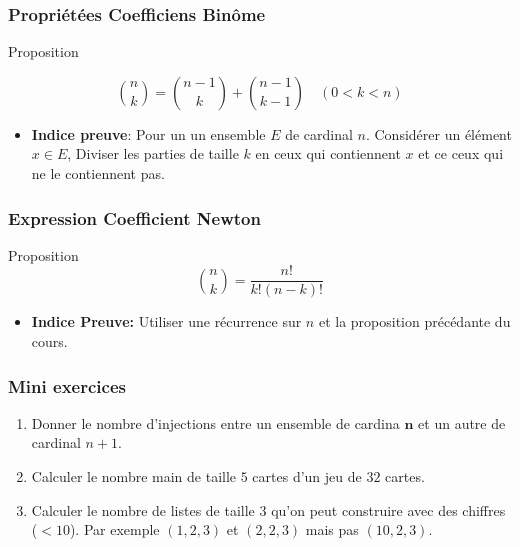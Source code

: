 \begin{frame}[<+->]
  \frametitle{Propriétées Coefficiens Binôme}
 \begin{block}{Proposition}

  \begin{equation}
    \binom{n}{k} = \binom{n-1}{k} + \binom{n-1}{k-1} \quad (0< k < n)
  \end{equation}
 \end{block} 

 \begin{itemize}
 \item \textbf{\alert{Indice preuve}}: Pour un un ensemble $E$ de cardinal
     $n$. Considérer un élément $x\in E$, Diviser les parties de taille $k$ en
     ceux qui contiennent $x$ et ce ceux qui ne le contiennent pas. 
 \end{itemize}
\end{frame}

\begin{frame}[<+->]
  \frametitle{Expression Coefficient Newton}
\begin{block}{Proposition}
  \begin{equation}
    \binom{n}{k} =  \dfrac{n!}{k!(n-k)!}
  \end{equation}
\end{block}
\pause

\begin{itemize}
  \item \alert{\textbf{Indice Preuve:}} Utiliser une récurrence sur $n$
    et la proposition précédante du cours.
\end{itemize}
\end{frame}

\begin{frame}[<+->]
  \frametitle{Mini exercices}
 \begin{enumerate}
   \small
   \item Donner le nombre d'injections entre un ensemble de cardina
     $\mathbf{n}$ et un autre de cardinal $n+1$.\\[8pt]
   \item Calculer le nombre main  de taille $5$ cartes d'un jeu de $32$
     cartes.\\[8pt]
   \item Calculer le nombre de listes de taille $3$ qu'on peut construire
     avec des chiffres ($<10$). Par exemple $(1,2,3)$ et $(2,2,3)$ mais
     pas $(10,2,3)$.\\[8pt]
 \end{enumerate} 

\end{frame}

